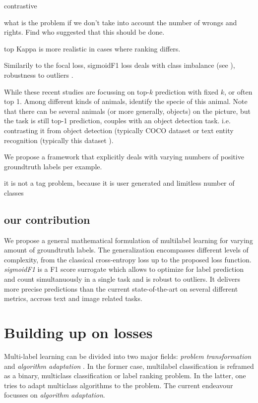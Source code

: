 \documentclass[sigconf,natbib,screen=true,review=true,anonymous]{acmart}
\begin{document}
contrastive

what is the problem if we don't take into account the number of wrongs and rights.
Find who suggested that this should be done.

top Kappa is more realistic in cases where ranking differs.

Similarily to the focal loss, sigmoidF1 loss deals with class imbalance (see \cite{focalLoss}), robustness to outliers \cite{focalLoss}.

While these recent studies are focussing on top-\(k\) prediction with fixed \(k\), or often top 1. Among different kinds of animals, identify the specie of this animal. Note that there can be several animals (or more generally, objects) on the picture, but the task is still top-1 prediction, couples with an object detection task. i.e. contrasting it from object detection (typically COCO dataset  or text entity recognition (typically this dataset ).

We propose a framework that explicitly deals with varying numbers of positive groundtruth labels per example.


it is not a tag problem, because it is user generated and limitless number of classes


\subsection{our contribution}
\label{sec:orgcd59138}

We propose a general mathematical formulation of multilabel learning for varying amount of groundtruth labels. The generalization encompasses different levels of complexity, from the classical cross-entropy loss up to the proposed loss function. \emph{sigmoidF1} is a F1 score surrogate which allows to optimize for label prediction and count simultanuously in a single task and is robust to outliers. It delivers more precise predictions than the current state-of-the-art on several different metrics, accross text and image related tasks.


\section{Building up on losses}
\label{sec:org3178191}

Multi-label learning can be divided into two major fields: \emph{problem transformation} and \emph{algorithm adaptation} \cite{multilabelReview}. In the former case, multilabel classification is reframed as a binary, multiclass classification or label ranking problem. In the latter, one tries to adapt multiclass algorithms to the problem. The current endeavour focusses on \emph{algorithm adaptation}.
\end{document}
